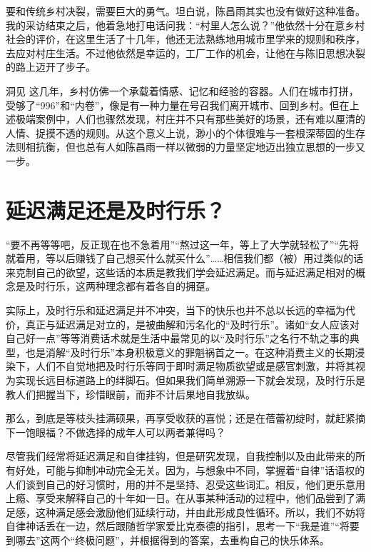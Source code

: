 要和传统乡村决裂，需要巨大的勇气。坦白说，陈昌雨其实也没有做好这种准备。我的采访结束之后，他着急地打电话问我：“村里人怎么说？”他依然十分在意乡村社会的评价，在这里生活了十几年，他还无法熟练地用城市里学来的规则和秩序，去应对村庄生活。不过他依然是幸运的，工厂工作的机会，让他在与陈旧思想决裂的路上迈开了步子。

\begin{quoteBox}{洞见}
这几年，乡村仿佛一个承载着情感、记忆和经验的容器。人们在城市打拼，受够了“996”和“内卷”，像是有一种力量在号召我们离开城市、回到乡村。但在上述极端案例中，人们也骤然发现，村庄并不只有那些美好的场景，还有难以厘清的人情、捉摸不透的规则。从这个意义上说，渺小的个体很难与一套根深蒂固的生存法则相抗衡，但也总有人如陈昌雨一样以微弱的力量坚定地迈出独立思想的一步又一步。
\end{quoteBox}

\clearpage
\section*{延迟满足还是及时行乐？}

“要不再等等吧，反正现在也不急着用”“熬过这一年，等上了大学就轻松了”“先将就着用，等以后赚钱了自己想买什么就买什么”……相信我们都（被）用过类似的话来克制自己的欲望，这些话的本质是教我们学会延迟满足。而与延迟满足相对的概念是及时行乐，这两种理念都有着各自的拥趸。

实际上，及时行乐和延迟满足并不冲突，当下的快乐也并不总以长远的幸福为代价，真正与延迟满足对立的，是被曲解和污名化的“及时行乐”。诸如“女人应该对自己好一点”等等消费话术就是生活中最常见的以“及时行乐”之名行不轨之事的典型，也是消解“及时行乐”本身积极意义的罪魁祸首之一。在这种消费主义的长期浸染下，人们不自觉地把及时行乐等同于即时满足物质欲望或是感官刺激，并将其视为实现长远目标道路上的绊脚石。但如果我们简单溯源一下就会发现，及时行乐是教人们把握当下，珍惜眼前，而非不计后果地自我放纵。

那么，到底是等枝头挂满硕果，再享受收获的喜悦；还是在蓓蕾初绽时，就赶紧摘下一饱眼福？不做选择的成年人可以两者兼得吗？

尽管我们经常将延迟满足和自律挂钩，但是研究发现，自我控制以及由此带来的所有好处，可能与抑制冲动完全无关。因为，与想象中不同，掌握着“自律”话语权的人们谈到自己的好习惯时，用的并不是坚持、忍受这些词汇。相反，他们更乐意用上瘾、享受来解释自己的十年如一日。在从事某种活动的过程中，他们品尝到了满足感，这种满足感会激励他们延续行动，并由此形成良性循环。所以，我们不妨将自律神话丢在一边，然后跟随哲学家爱比克泰德的指引，思考一下“我是谁”“将要到哪去”这两个“终极问题”，并根据得到的答案，去重构自己的快乐体系。

